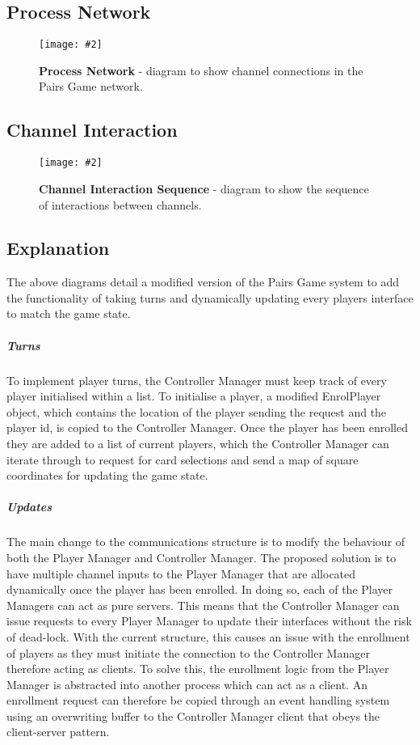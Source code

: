 \documentclass[10pt, a4paper]{article}
\newcommand{\figuremacro}[5]{
    \begin{figure}[#1]
        \centering
        \texttt{[image: \#2]}
        \caption[#3]{\textbf{#3}#4}
        \label{fig:#2}
    \end{figure}
}
\begin{document}
	\subsection{Process Network}
	
	\figuremacro{H}{processNetwork}{Process Network}{ - diagram to show channel connections in the Pairs Game network.}{1.0}
	
	\subsection{Channel Interaction}
	
	\figuremacro{H}{channelInt}{Channel Interaction Sequence}{ - diagram to show the sequence of interactions between channels.}{1.0}
	
	\subsection{Explanation}
	
	The above diagrams detail a modified version of the Pairs Game system to add the functionality of taking turns and dynamically updating every players interface to match the game state.
	
	\subparagraph{Turns}	
	To implement player turns, the Controller Manager must keep track of every player initialised within a list. To initialise a player, a modified EnrolPlayer object, which contains the location of the player sending the request and the player id, is copied to the Controller Manager. Once the player has been enrolled they are added to a list of current players, which the Controller Manager can iterate through to request for card selections and send a map of square coordinates for updating the game state.
	
	\subparagraph{Updates}
	The main change to the communications structure is to modify the behaviour of both the Player Manager and Controller Manager.	The proposed solution is to have multiple channel inputs to the Player Manager that are allocated dynamically once the player has been enrolled. In doing so, each of the Player Managers can act as pure servers. This means that the Controller Manager can issue requests to every Player Manager to update their interfaces without the risk of dead-lock. With the current structure, this causes an issue with the enrollment of players as they must initiate the connection to the Controller Manager therefore acting as clients. To solve this, the enrollment logic from the Player Manager is abstracted into another process which can act as a client. An enrollment request can therefore be copied through an event handling system using an overwriting buffer to the Controller Manager client that obeys the client-server pattern.
	
\end{document}
